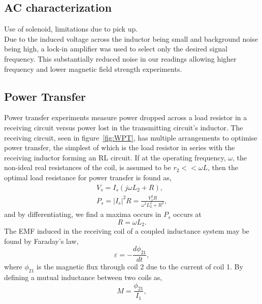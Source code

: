 \documentclass[11pt]{iopart}
\begin{document}
\subsection{AC characterization}

Use of solenoid, limitations due to pick up.\\
Due to the induced voltage across the inductor being small and
background noise being high, a lock-in amplifier was used to select
only the desired signal frequency. This substantially reduced noise in
our readings allowing higher frequency and lower magnetic field
strength experiments.\\

\subsection{Power Transfer}
Power transfer experiments measure power dropped across a load
resistor in a receiving circuit versus power lost in the transmitting
circuit's inductor. The receiving circuit, seen in
figure~\ref{fig:WPT}, has multiple arrangements to optimise power
transfer, the simplest of which is the load resistor in series with
the receiving inductor forming an RL circuit. If at the operating
frequency, $\omega$, the non-ideal real resistances of the coil, is
assumed to be $r_2 << \omega L$, then the optimal load resistance for
power transfer is found as,
\vspace{-1em}
\begin{equation}
  \begin{split}
  V_s = I_s (j\omega L_2 + R),  \\
  P_s = |I_s|^2R = \frac{V_s^2R}{\omega^2L_2^2 + R^2},
  \label{eqn:RL-max}
  \end{split}
\end{equation}
and by differentiating, we find a maxima occurs in $P_s$ occurs at
\begin{equation}
  R = \omega L_2.
\end{equation}
The EMF induced in the receiving coil of a coupled inductance system may be found by Faraday's law,
\vspace{-0.5em}
\begin{equation}
  \varepsilon = -\frac{d\phi_{21}}{dt},
\end{equation}
where $\phi_{21}$ is the magnetic flux through coil 2 due
to the current of coil 1.  By defining a mutual inductance between two
coils as,
\vspace{-0.5em}
\begin{equation}
  M = \frac{\phi_{21}}{I_1},
\end{equation}
\end{document}
